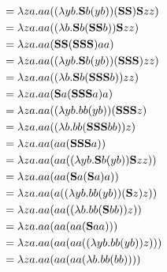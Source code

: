 	\begin{align*}
		& = \lambda za.a a((\lambda yb.\textbf{S} b(y b))(\textbf{S}\textbf{S} )\textbf{S} z z)\\
		& = \lambda za.a a((\lambda b.\textbf{S} b(\textbf{S}\textbf{S} b))\textbf{S} z z)\\
		& = \lambda za.a a(\textbf{S} \textbf{S}(\textbf{S}\textbf{S}\textbf{S})a a)\\
		& = \lambda za.a a((\lambda yb.\textbf{S} b(y b))(\textbf{S}\textbf{S}\textbf{S})z z)\\
		& = \lambda za.a a((\lambda b.\textbf{S} b(\textbf{S}\textbf{S}\textbf{S} b))z z)\\
		& = \lambda za.a a(\textbf{S} a(\textbf{S}\textbf{S}\textbf{S} a)a)\\
		& = \lambda za.a a((\lambda yb.b b(y b))(\textbf{S}\textbf{S}\textbf{S} z)\\
		& = \lambda za.a a((\lambda b.b b(\textbf{S}\textbf{S}\textbf{S} b b))z)\\
		& = \lambda za.a a(a a(\textbf{S}\textbf{S}\textbf{S} a))\\
		& = \lambda za.a a(a a((\lambda yb.\textbf{S} b(y b))\textbf{S} z z))\\
		& = \lambda za.a a(a a (\textbf{S} a(\textbf{S} a)a))\\
		& = \lambda za.a a(a((\lambda yb.b b(y b))(\textbf{S} z)z))\\
		& = \lambda za.a a(a a((\lambda b.b b(\textbf{S} b b))z))\\
		& = \lambda za.a a(a a(a a(\textbf{S} a a)))\\
		& = \lambda za.a a(a a(a a((\lambda yb.b b(y b))z)))\\
		& = \lambda za.a a(a a(a a(\lambda b.b b(b b))))\\
	\end{align*}